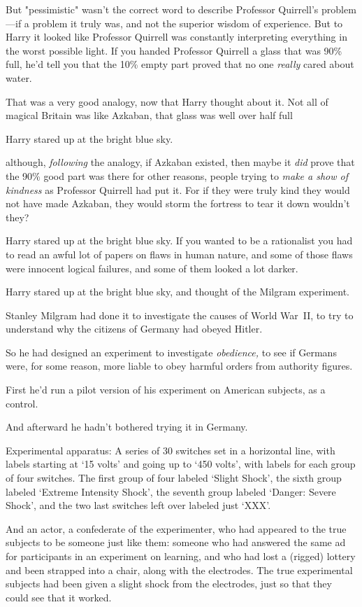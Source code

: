 But "pessimistic" wasn't the correct word to describe Professor Quirrell's
problem---if a problem it truly was, and not the superior wisdom of experience.
But to Harry it looked like Professor Quirrell was constantly interpreting
everything in the worst possible light. If you handed Professor Quirrell a
glass that was 90\% full, he'd tell you that the 10\% empty part proved that no
one \emph{really} cared about water.

That was a very good analogy, now that Harry thought about it. Not all of
magical Britain was like Azkaban, that glass was well over half full{\el}

Harry stared up at the bright blue sky.

{\el} although, \emph{following} the analogy, if Azkaban existed, then maybe
it \emph{did} prove that the 90\% good part was there for other reasons, people
trying to \emph{make a show of kindness} as Professor Quirrell had put it. For
if they were truly kind they would not have made Azkaban, they would storm the
fortress to tear it down{\el} wouldn't they?

Harry stared up at the bright blue sky. If you wanted to be a rationalist you
had to read an awful lot of papers on flaws in human nature, and some of those
flaws were innocent logical failures, and some of them looked a lot darker.

Harry stared up at the bright blue sky, and thought of the Milgram experiment.

Stanley Milgram had done it to investigate the causes of World War~II, to try
to understand why the citizens of Germany had obeyed Hitler.

So he had designed an experiment to investigate \emph{obedience,} to see if
Germans were, for some reason, more liable to obey harmful orders from
authority figures.

First he'd run a pilot version of his experiment on American subjects, as a
control.

And afterward he hadn't bothered trying it in Germany.

Experimental apparatus: A series of 30 switches set in a horizontal line, with
labels starting at `15 volts' and going up to `450 volts', with labels for each
group of four switches. The first group of four labeled `Slight Shock', the
sixth group labeled `Extreme Intensity Shock', the seventh group labeled
`Danger: Severe Shock', and the two last switches left over labeled just `XXX'.

And an actor, a confederate of the experimenter, who had appeared to the true
subjects to be someone just like them: someone who had answered the same ad for
participants in an experiment on learning, and who had lost a (rigged) lottery
and been strapped into a chair, along with the electrodes. The true
experimental subjects had been given a slight shock from the electrodes, just
so that they could see that it worked.

